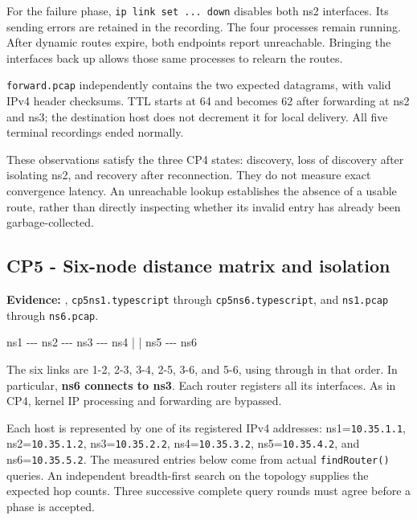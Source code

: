 \documentclass[
  a4paper,
  10pt]{article}
\newenvironment{Shaded}{}{}
\newcommand{\NormalTok}[1]{#1}
\begin{document}
For the failure phase, \texttt{ip\ link\ set\ ...\ down} disables both
ns2 interfaces. Its sending errors are retained in the recording. The
four processes remain running. After dynamic routes expire, both
endpoints report unreachable. Bringing the interfaces back up allows
those same processes to relearn the routes.

\texttt{forward.pcap} independently contains the two expected datagrams,
with valid IPv4 header checksums. TTL starts at 64 and becomes 62 after
forwarding at ns2 and ns3; the destination host does not decrement it
for local delivery. All five terminal recordings ended normally.

These observations satisfy the three CP4 states: discovery, loss of
discovery after isolating ns2, and recovery after reconnection. They do
not measure exact convergence latency. An unreachable lookup establishes
the absence of a usable route, rather than directly inspecting whether
its invalid entry has already been garbage-collected.

\newpage

\subsection{CP5 - Six-node distance matrix and
isolation}\label{cp5---six-node-distance-matrix-and-isolation}

\textbf{Evidence:} {\ttfamily{}},
\texttt{cp5ns1.typescript} through \texttt{cp5ns6.typescript}, and
\texttt{ns1.pcap} through \texttt{ns6.pcap}.

\begin{Shaded}
\begin{Highlighting}[]
\NormalTok{ns1 {-}{-}{-} ns2 {-}{-}{-} ns3 {-}{-}{-} ns4}
\NormalTok{         |       |}
\NormalTok{        ns5 {-}{-}{-} ns6}
\end{Highlighting}
\end{Shaded}

The six links are 1-2, 2-3, 3-4, 2-5, 3-6, and 5-6, using
{\ttfamily{}} through {\ttfamily{}} in
that order. In particular, \textbf{ns6 connects to ns3}. Each router
registers all its interfaces. As in CP4, kernel IP processing and
forwarding are bypassed.

Each host is represented by one of its registered IPv4 addresses:
ns1=\texttt{10.35.1.1}, ns2=\texttt{10.35.1.2}, ns3=\texttt{10.35.2.2},
ns4=\texttt{10.35.3.2}, ns5=\texttt{10.35.4.2}, and
ns6=\texttt{10.35.5.2}. The measured entries below come from actual
\texttt{findRouter()} queries. An independent breadth-first search on
the topology supplies the expected hop counts. Three successive complete
query rounds must agree before a phase is accepted.
\end{document}
